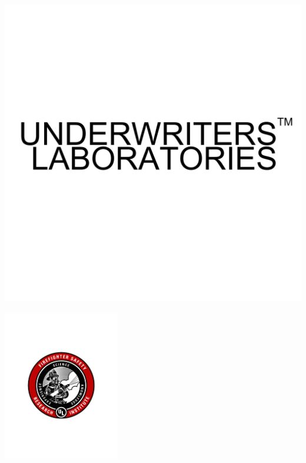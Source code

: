\documentclass[12pt,oneside]{book}
\begin{document}
\begin{minipage}[t][9in][s]{6.25in}
\begin{flushright}
\begin{minipage}{0.5\textwidth}
\includegraphics[width=\textwidth]{UnderwritersLaboratories_TM} \\ 
\end{minipage} \hfill
\begin{minipage}{0.25\textwidth}
\includegraphics[width=2.0in]{FSRI_GraphicShield} \\ 
\end{minipage}
\end{flushright}
\titlesigs

\footnotesize
{}
\end{minipage}
\end{document}
